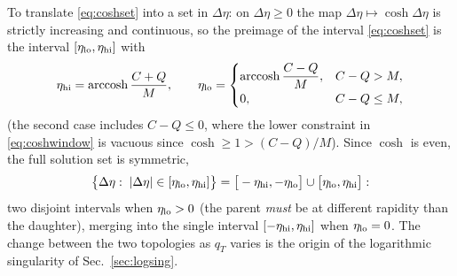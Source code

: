 \documentclass[11pt]{article}
\begin{document}
To translate \eqref{eq:coshset} into a set in $\Delta\eta$: on
$\Delta\eta\ge0$ the map $\Delta\eta\mapsto\cosh\Delta\eta$ is strictly
increasing and continuous, so the preimage of the interval
\eqref{eq:coshset} is the interval $[\eta_{\rm lo},\eta_{\rm hi}]$ with
\begin{equation}
\eta_{\rm hi}=\operatorname{arccosh}\frac{C+Q}{M},
\qquad
\eta_{\rm lo}=
\begin{cases}
\operatorname{arccosh}\dfrac{C-Q}{M}, & C-Q>M,\\[4pt]
0, & C-Q\le M ,
\end{cases}
\label{eq:window}
\end{equation}
(the second case includes $C-Q\le0$, where the lower constraint in
\eqref{eq:coshwindow} is vacuous since $\cosh\ge1>\!(C-Q)/M$).  Since
$\cosh$ is even, the full solution set is symmetric,
\begin{equation}
\big\{\Delta\eta:\;|\Delta\eta|\in[\eta_{\rm lo},\eta_{\rm hi}]\big\}
=\big[-\eta_{\rm hi},-\eta_{\rm lo}\big]\cup
 \big[\eta_{\rm lo},\eta_{\rm hi}\big]:
\end{equation}
two disjoint intervals when $\eta_{\rm lo}>0$ (the parent \emph{must} be
at different rapidity than the daughter), merging into the single
interval $[-\eta_{\rm hi},\eta_{\rm hi}]$ when $\eta_{\rm lo}=0$.  The
change between the two topologies as $q_T$ varies is the origin of the
logarithmic singularity of Sec.~\ref{sec:logsing}.
\end{document}
